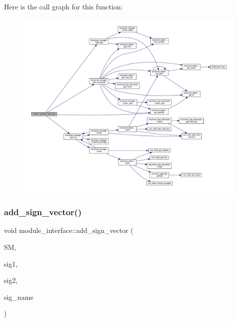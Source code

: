 Here is the call graph for this function\+:
\nopagebreak
\begin{figure}[H]
\begin{center}
\leavevmode
\includegraphics[width=350pt]{d9/d0e/classmodule__interface_ad3a3d5baf94859db72af7365110fa702_cgraph}
\end{center}
\end{figure}
\mbox{\label{classmodule__interface_a07e4684bc7c049dde53a1b1ab7fa450e}} 
\subsubsection{\texorpdfstring{add\+\_\+sign\+\_\+vector()}{add\_sign\_vector()}}
{\footnotesize\ttfamily void module\+\_\+interface\+::add\+\_\+sign\+\_\+vector (\begin{DoxyParamCaption}\item[{const \hyperlink{structural__manager_8hpp_ab3136f0e785d8535f8d252a7b53db5b5}{structural\+\_\+manager\+Ref}}]{SM,  }\item[{const \hyperlink{structural__objects_8hpp_a8ea5f8cc50ab8f4c31e2751074ff60b2}{structural\+\_\+object\+Ref}}]{sig1,  }\item[{const \hyperlink{structural__objects_8hpp_a8ea5f8cc50ab8f4c31e2751074ff60b2}{structural\+\_\+object\+Ref}}]{sig2,  }\item[{const std\+::string \&}]{sig\+\_\+name }\end{DoxyParamCaption})\hspace{0.3cm}{\ttfamily [protected]}}



